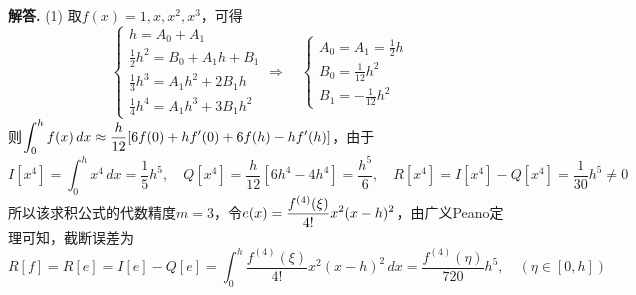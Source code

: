 \documentclass[12pt, a4paper, oneside]{ctexart}
\newenvironment{solution}{\par\noindent\textbf{解答. }}{\bigskip\par}
\begin{document}
\begin{solution}
    (1) 取$f(x) = 1, x, x^2, x^3$，可得
    \begin{equation*}
        \begin{cases}
            h=A_0+A_1\\
            \frac{1}{2}h^2=B_0+A_1h+B_1\\
            \frac{1}{3}h^3=A_1h^2+2B_1h\\
            \frac{1}{4}h^4=A_1h^3+3B_1h^2
        \end{cases}
        \Rightarrow\quad\begin{cases}
            A_0 = A_1 = \frac{1}{2}h\\
            B_0 = \frac{1}{12}h^2\\
            B_1=-\frac{1}{12}h^2
        \end{cases}
    \end{equation*}
    则$\displaystyle \int_0^hf(x)\,dx\approx\frac{h}{12}[6f(0)+hf'(0)+6f(h)-hf'(h)]$，由于
    \begin{equation*}
        I[x^4]=\int_0^hx^4\,dx = \frac{1}{5}h^5,\quad Q[x^4]=\frac{h}{12}[6h^4-4h^4] = \frac{h^5}{6},\quad R[x^4] = I[x^4] - Q[x^4] = \frac{1}{30}h^5\neq 0
    \end{equation*}
    所以该求积公式的代数精度$m=3$，令$\displaystyle e(x) = \frac{f^{(4)}(\xi)}{4!}x^2(x-h)^2$，由广义Peano定理可知，截断误差为
    \begin{equation*}
        R[f] = R[e] = I[e] - Q[e] = \int_0^h\frac{f^{(4)}(\xi)}{4!}x^2(x-h)^2\,dx = \frac{f^{(4)}(\eta)}{720}h^5,\quad(\eta\in[0,h])
    \end{equation*}


\end{solution}
\end{document}
